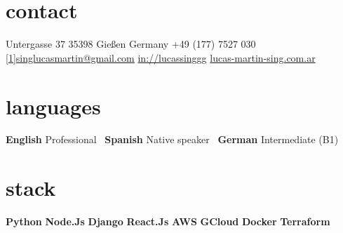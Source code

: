 \documentclass[a4paper,nocolors]{friggeri-cv}
\begin{document}


\begin{aside} %
\section{contact}
\pin \hfill Untergasse 37
35398 Gießen
Germany\vspace{1em}
{\Large\textcolor{gray}{\Mobilefone}} \hfill +49 (177) 7527 030
\hfill \href{mailto:singlucasmartin@gmail.com}{\scalebox{0.9}[1]{singlucasmartin@gmail.com}}\vspace{1.25em}
\llogo \hfill \href{https://www.linkedin.com/in/lucassinggg}{in://lucassinggg}\vspace{0.1em}
\weblogo \hfill \href{https://www.lucas-martin-sing.com.ar}{lucas-martin-sing.com.ar}\vspace{2em}
\section{languages}
\textbf{English} \hfill Professional~
\textbf{Spanish} \hfill Native speaker~
\textbf{German} \hfill Intermediate (B1)~\vspace{2em}
\section{stack}
\textbf{Python} \hfill \filleddot \filleddot \filleddot \filleddot \emptydot
\textbf{Node.Js} \hfill \filleddot \filleddot \filleddot \emptydot \emptydot
\textbf{Django} \hfill \filleddot \filleddot \filleddot \filleddot \filleddot
\textbf{React.Js} \hfill \filleddot \filleddot \filleddot \emptydot \emptydot
\textbf{AWS} \hfill \filleddot \filleddot \filleddot \emptydot \emptydot
\textbf{GCloud} \hfill \filleddot \filleddot \filleddot \emptydot \emptydot
\textbf{Docker} \hfill \filleddot \filleddot \filleddot \filleddot \emptydot
\textbf{Terraform} \hfill \filleddot \filleddot \filleddot \emptydot \emptydot
\end{aside}

\end{document}
